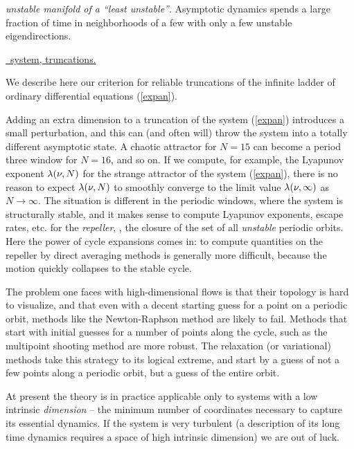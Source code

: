{\em unstable manifold of a ``least unstable''{\eqv}}.
 Asymptotic dynamics
spends  a large fraction of time in
neighborhoods of a few  {\eqva} with
only a few unstable eigendirections.


\underline{\KS\ system, truncations.}{
We describe here our criterion for reliable
truncations of the infinite ladder of 
ordinary differential equations (\ref{expan}).

Adding an extra dimension to a truncation of the system (\ref{expan})
introduces a small
perturbation, and this can (and often will) 
throw the system into a totally different asymptotic state. 
A  chaotic attractor for $N=15$ can become a period three 
window for $N=16$, and so on. 
If we compute, for example, the Lyapunov exponent
$\lambda(\nu,N)$ for the strange attractor of the 
system (\ref{expan}), there is no reason to 
expect $\lambda(\nu,N)$ to smoothly converge to the limit  
value $\lambda(\nu,\infty)$ as $N \rightarrow \infty$. 
The situation is different in the periodic windows, 
where the system is structurally stable, and it makes sense to compute 
 Lyapunov exponents, escape rates, etc. for the 
{\em repeller}, \ie, the closure of the set of all 
{\em unstable} periodic orbits. 
Here the power of cycle expansions comes in: 
to compute quantities on the repeller by direct averaging methods is 
generally more difficult, because the motion quickly collapses to the 
stable cycle. 
    } %


The problem one faces with high-dimensional flows is 
that their topology is hard to
visualize, and that even with a decent starting guess for a point on
a periodic orbit, methods like the Newton-Raphson method are likely to fail.
Methods that start with initial guesses for a number of points along the
cycle, such as the multipoint shooting method
are more robust.
The relaxation  (or variational) methods take this strategy to its
logical extreme,
and start by a guess of not a few points along a periodic orbit,
but a guess of the entire orbit.

At present the theory is in practice applicable only to systems
with a low intrinsic {\em dimension}
-- the minimum number of coordinates necessary to
capture its essential dynamics.
If the system is very turbulent
(a description of its long time dynamics requires a space of high
intrinsic dimension) we are out of luck. 

% 


